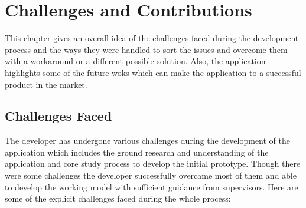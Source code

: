 \chapter{Challenges and Contributions}

\label{ch:summary}

This chapter gives an overall idea of the challenges faced during the development process and the ways they were handled to sort the issues and overcome them with a workaround or a different possible solution. Also, the application highlights some of the future woks which can make the application to a successful product in the market.

\section{Challenges Faced}
The developer has undergone various challenges during the development of the application which includes the ground research and understanding of the application and core study process to develop the initial prototype. Though there were some challenges the developer successfully overcame most of them and able to develop the working model with sufficient guidance from supervisors. 
Here are some of the explicit challenges faced during the whole process:

